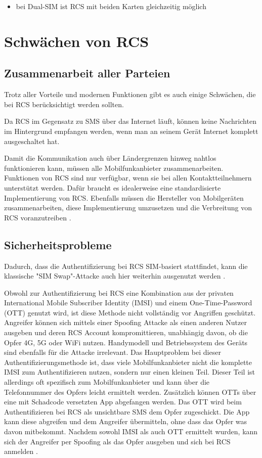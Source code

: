 \documentclass[conference]{IEEEtran}
\begin{document}
\begin{itemize}
    \item bei Dual-SIM ist RCS mit beiden Karten gleichzeitig möglich
\end{itemize}
\cite{uniprof}


\section{Schwächen von RCS}

\subsection{Zusammenarbeit aller Parteien}

Trotz aller Vorteile und modernen Funktionen gibt es auch einige Schwächen, die bei RCS berücksichtigt werden sollten.

Da RCS im Gegensatz zu SMS über das Internet läuft, können keine Nachrichten im Hintergrund empfangen werden, wenn man an seinem Gerät Internet komplett ausgeschaltet hat.

Damit die Kommunikation auch über Ländergrenzen hinweg nahtlos funktionieren kann, müssen alle Mobilfunkanbieter zusammenarbeiten.
Funktionen von RCS sind nur verfügbar, wenn sie bei allen Kontaktteilnehmern unterstützt werden.
Dafür braucht es idealerweise eine standardisierte Implementierung von RCS.
Ebenfalls müssen die Hersteller von Mobilgeräten zusammenarbeiten, diese Implementierung umzusetzen und die Verbreitung von RCS voranzutreiben \cite{rcsmno}.

\subsection{Sicherheitsprobleme}

Dadurch, dass die Authentifizierung bei RCS SIM-basiert stattfindet, kann die klassische "SIM Swap"-Attacke auch hier weiterhin ausgenutzt werden \cite{sendoutsms}.

Obwohl zur Authentifizierung bei RCS eine Kombination aus der privaten International Mobile Subscriber Identity (IMSI) und einem One-Time-Password (OTT) genutzt wird, ist diese Methode nicht vollständig vor Angriffen geschützt.
Angreifer können sich mittels einer Spoofing Attacke als einen anderen Nutzer ausgeben und deren RCS Account kompromittieren, unabhängig davon, ob die Opfer 4G, 5G oder WiFi nutzen.
Handymodell und Betriebssystem des Geräts sind ebenfalls für die Attacke irrelevant.
Das Hauptproblem bei dieser Authentifizierungsmethode ist, dass viele Mobilfunkanbieter nicht die komplette IMSI zum Authentifizieren nutzen, sondern nur einen kleinen Teil.
Dieser Teil ist allerdings oft spezifisch zum Mobilfunkanbieter und kann über die Telefonnummer des Opfers leicht ermittelt werden.
Zusätzlich können OTTs über eine mit Schadcode versetzten App abgefangen werden.
Das OTT wird beim Authentifizieren bei RCS als unsichtbare SMS dem Opfer zugeschickt.
Die App kann diese abgreifen und dem Angreifer übermitteln, ohne dass das Opfer was davon mitbekommt.
Nachdem sowohl IMSI als auch OTT ermittelt wurden, kann sich der Angreifer per Spoofing als das Opfer ausgeben und sich bei RCS anmelden \cite{5gmsg}.
\end{document}

